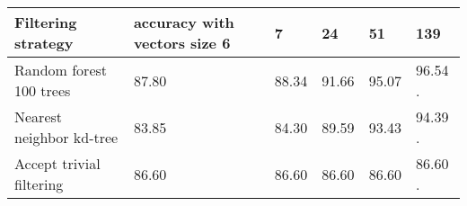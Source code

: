 \documentclass[12pt,a4paper]{article}
\begin{document}
\begin{singlespace}
\begin{center}
    \begin{tabular}{ | l | l | l| l|l|l|}
    \hline
    Filtering strategy  & accuracy with vectors size 6
    & 7 & 24 & 51 & 139  \\ \hline
    Random forest 100 trees & 87.80 & 88.34 & 91.66 & 95.07 & 96.54 .   \\ \hline
    Nearest neighbor kd-tree & 83.85 & 84.30 & 89.59 & 93.43 & 94.39 .  \\ \hline
    Accept trivial filtering & 86.60 & 86.60 & 86.60 & 86.60 & 86.60 . \\\hline
    \end{tabular}
\end{center}


\end{singlespace}
\end{document}

